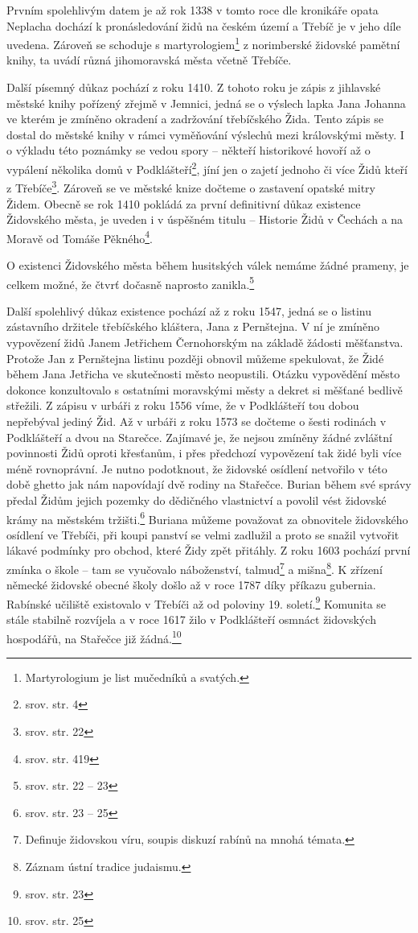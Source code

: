 \documentclass[a4paper,oneside,12pt]{report}
\begin{document}
Prvním spolehlivým datem je až rok 1338 v tomto roce dle kronikáře opata Neplacha dochází k pronásledování židů na českém území a Třebíč je v jeho díle uvedena.
Zároveň se schoduje s martyrologiem\footnote{Martyrologium je list mučedníků a svatých.} z norimberské židovské pamětní knihy, ta uvádí různá jihomoravská města včetně Třebíče.

Další písemný důkaz pochází z roku 1410.
Z tohoto roku je zápis z jihlavské městské knihy pořízený zřejmě v Jemnici, jedná se o výslech lapka Jana Johanna ve kterém je zmíněno okradení a zadržování třebíčského Žida.
Tento zápis se dostal do městské knihy v rámci vyměňování výslechů mezi královskými městy.
I o výkladu této poznámky se vedou spory -- někteří historikové hovoří až o vypálení několika domů v Podklášteří\footnote{srov.  str. 4}, jíní jen o zajetí jednoho či více Židů kteří z Třebíče\footnote{srov. \cite{Fiser2005} str. 22}.
Zároveň se ve městské knize dočteme o zastavení opatské mitry Židem.
Obecně se rok 1410 pokládá za první definitivní důkaz existence Židovského města, je uveden i v úspěšném titulu -- Historie Židů v Čechách a na Moravě od Tomáše Pěkného\footnote{srov.  str. 419}.

O existenci Židovského města během husitských válek nemáme žádné prameny, je celkem možné, že čtvrť dočasně naprosto zanikla.\footnote{srov. \cite{Fiser2005} str. 22 -- 23}

Další spolehlivý důkaz existence pochází až z roku 1547, jedná se o listinu zástavního držitele třebíčského kláštera, Jana z Pernštejna.
V ní je zmíněno vypovězení židů Janem Jetřichem Černohorským na základě žádosti měšťanstva.
Protože Jan z Pernštejna listinu později obnovil můžeme spekulovat, že Židé během Jana Jetřicha ve skutečnosti město neopustili.
Otázku vypovědění město dokonce konzultovalo s ostatními moravskými městy a dekret si měšťané bedlivě střežili.
Z zápisu v urbáři z roku 1556 víme, že v Podklášteří tou dobou nepřebýval jediný Žid.
Až v urbáři z roku 1573 se dočteme o šesti rodinách v Podklášteří a dvou na Starečce.
Zajímavé je, že nejsou zmíněny žádné zvláštní povinnosti Židů oproti křesťanům, i přes předchozí vypovězení tak židé byli více méně rovnoprávní.
Je nutno podotknout, že židovské osídlení netvořilo v této době ghetto jak nám napovídají dvě rodiny na Stařečce.
Burian během své správy předal Židům jejich pozemky do dědičného vlastnictví a povolil vést židovské krámy na městském tržišti.\footnote{srov. \cite{Fiser2005} str. 23 -- 25}
Buriana můžeme považovat za obnovitele židovského osídlení ve Třebíči, při koupi panství se velmi zadlužil a proto se snažil vytvořit lákavé podmínky pro obchod, které Židy zpět přitáhly.
Z roku 1603 pochází první zmínka o škole -- tam se vyučovalo náboženství, talmud\footnote{Definuje židovskou víru, soupis diskuzí rabínů na mnohá témata.} a mišna\footnote{Záznam ústní tradice judaismu.}.
K zřízení německé židovské obecné školy došlo až v roce 1787 díky příkazu gubernia.
Rabínské učiliště existovalo v Třebíči až od poloviny 19. soletí.\footnote{srov. \cite{Klenovsky2003} str. 23}
Komunita se stále stabilně rozvíjela a v roce 1617 žilo v Podklášteří osmnáct židovských hospodářů, na Stařečce již žádná.\footnote{srov. \cite{Fiser2005} str. 25}
\end{document}
